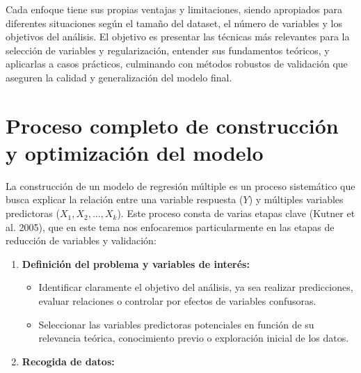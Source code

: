 \documentclass[
  letterpaper,
  DIV=11,
  numbers=noendperiod]{scrreprt}
\providecommand{\tightlist}{%
  \setlength{\itemsep}{0pt}\setlength{\parskip}{0pt}}
\begin{document}
Cada enfoque tiene sus propias ventajas y limitaciones, siendo
apropiados para diferentes situaciones según el tamaño del dataset, el
número de variables y los objetivos del análisis. El objetivo es
presentar las técnicas más relevantes para la selección de variables y
regularización, entender sus fundamentos teóricos, y aplicarlas a casos
prácticos, culminando con métodos robustos de validación que aseguren la
calidad y generalización del modelo final.

\section{Proceso completo de construcción y optimización del
modelo}\label{proceso-completo-de-construcciuxf3n-y-optimizaciuxf3n-del-modelo}

La construcción de un modelo de regresión múltiple es un proceso
sistemático que busca explicar la relación entre una variable respuesta
(\(Y\)) y múltiples variables predictoras (\(X_1, X_2, \dots, X_k\)).
Este proceso consta de varias etapas clave (Kutner et al. 2005), que en
este tema nos enfocaremos particularmente en las etapas de reducción de
variables y validación:

\begin{enumerate}
\def\labelenumi{\arabic{enumi}.}
\tightlist
\item
  \textbf{Definición del problema y variables de interés:}

  \begin{itemize}
  \tightlist
  \item
    Identificar claramente el objetivo del análisis, ya sea realizar
    predicciones, evaluar relaciones o controlar por efectos de
    variables confusoras.
  \item
    Seleccionar las variables predictoras potenciales en función de su
    relevancia teórica, conocimiento previo o exploración inicial de los
    datos.
  \end{itemize}
\item
  \textbf{Recogida de datos:}
\end{enumerate}
\end{document}
